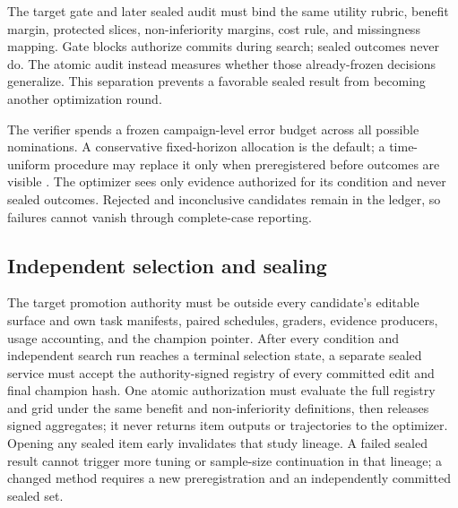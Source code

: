 The target gate and later sealed audit must bind the same utility rubric, benefit
margin, protected slices, non-inferiority margins, cost rule, and missingness
mapping.  Gate blocks authorize commits during search; sealed outcomes never do.
The atomic audit instead measures whether those already-frozen decisions
generalize.  This separation prevents a favorable sealed result from becoming
another optimization round.

The verifier spends a frozen campaign-level error budget across all possible
nominations.  A conservative fixed-horizon allocation is the default; a
time-uniform procedure may replace it only when preregistered before outcomes
are visible \citep{howard2021confidence}.  The optimizer sees only evidence
authorized for its condition and never sealed outcomes.  Rejected and
inconclusive candidates remain in the ledger, so failures cannot vanish through
complete-case reporting.

\subsection{Independent selection and sealing}

The target promotion authority must be outside every candidate's editable
surface and own task manifests, paired schedules, graders, evidence producers,
usage accounting, and the champion pointer.  After every condition and
independent search run reaches a terminal selection state, a separate sealed
service must accept the authority-signed registry of every committed edit and
final champion hash.  One atomic authorization must evaluate the full registry and grid under the same
benefit and non-inferiority definitions, then releases signed aggregates; it
never returns item outputs or trajectories to the optimizer.  Opening any
sealed item early invalidates that study lineage.  A failed sealed result cannot
trigger more tuning or sample-size continuation in that lineage; a changed
method requires a new preregistration and an independently committed sealed set.
